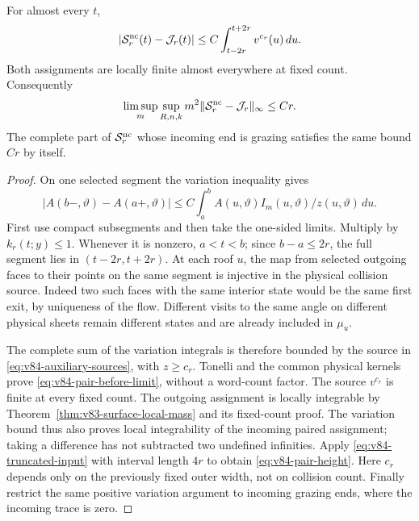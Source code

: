 \begin{theorem}
\label{thm:v84-paired-transfer}
For almost every $t$,
\begin{equation}\label{eq:v84-pair-before-limit}
 |\mathcal S_r^{\rm nc}(t)-\mathcal J_r(t)|
                      \le C\int_{t-2r}^{t+2r}v^{c_r}(u)\,du.
\end{equation}
Both assignments are locally finite almost everywhere at fixed count.
Consequently
\begin{equation}\label{eq:v84-pair-height}
 \limsup_m\sup_{R,n,k}m^2
       \|\mathcal S_r^{\rm nc}-\mathcal J_r\|_\infty\le Cr.
\end{equation}
The complete part of $\mathcal S_r^{\rm nc}$ whose incoming end
is grazing satisfies the same bound $Cr$ by itself.
\end{theorem}
\begin{proof}
On one selected segment the variation inequality gives
\[
 |A(b-,\vartheta)-A(a+,\vartheta)|
       \le C\int_a^b A(u,\vartheta)I_m(u,\vartheta)/z(u,\vartheta)\,du.
\]
First use compact subsegments and then take the one-sided limits.
Multiply by $k_r(t;y)\le1$. Whenever it is nonzero, $a<t<b$;
since $b-a\le2r$, the full segment lies in $(t-2r,t+2r)$.
At each roof $u$, the map from selected outgoing faces to their
points on the same segment is injective in the physical collision
source. Indeed two such faces with the same interior state would
be the same first exit, by uniqueness of the flow. Different visits
to the same angle on different physical sheets remain different
states and are already included in $\mu_u$.

The complete sum of the variation integrals is therefore bounded by
the source in \eqref{eq:v84-auxiliary-sources}, with $z\ge c_r$.
Tonelli and the common physical kernels prove
\eqref{eq:v84-pair-before-limit}, without a word-count factor.
The source $v^{c_r}$ is finite at every fixed count. The outgoing
assignment is locally integrable by Theorem~\ref{thm:v83-surface-local-mass}
and its fixed-count proof. The variation bound thus also proves local
integrability of the incoming paired assignment; taking a difference
has not subtracted two undefined infinities. Apply
\eqref{eq:v84-truncated-input} with interval length $4r$ to obtain
\eqref{eq:v84-pair-height}. Here $c_r$ depends only on the previously
fixed outer width, not on collision count. Finally restrict the same
positive variation argument to incoming grazing ends, where the
incoming trace is zero.
\end{proof}

